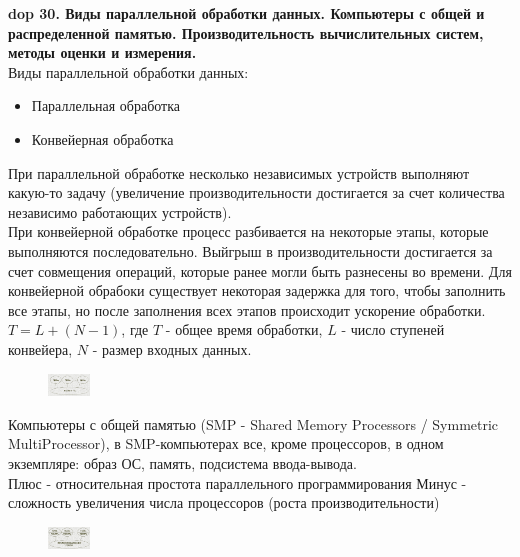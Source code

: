 \textbf{\LARGE dop 30. Виды параллельной обработки данных. Компьютеры с общей и распределенной памятью. Производительность вычислительных систем, методы оценки и измерения.}\\

Виды параллельной обработки данных:
\begin{itemize}
    \item Параллельная обработка
    \item Конвейерная обработка
\end{itemize}

При параллельной обработке несколько независимых устройств выполняют какую-то задачу (увеличение производительности достигается за счет количества независимо работающих устройств).\\
При конвейерной обработке процесс разбивается на некоторые этапы, которые выполняются последовательно. Выйгрыш в производительности достигается за счет совмещения операций, которые ранее могли быть разнесены во времени. Для конвейерной обрабоки существует некоторая задержка для того, чтобы заполнить все этапы, но после заполнения всех этапов происходит ускорение обработки. $T = L + (N - 1)$, где $T$ - общее время обработки, $L$ - число ступеней конвейера, $N$ - размер входных данных.\\

\begin{figure}
    \centering
    \includegraphics[width=0.1\textwidth]{pics/smp-computer.png}
\end{figure}

Компьютеры с общей памятью (SMP - Shared Memory Processors / Symmetric MultiProcessor), в SMP-компьютерах все, кроме процессоров, в одном экземпляре: образ ОС, память, подсистема ввода-вывода.\\
Плюс - относительная простота параллельного программирования
Минус - сложность увеличения числа процессоров (роста производительности)\\


\begin{figure}
    \centering
    \includegraphics[width=0.1\textwidth]{pics/distributed-memory-computer.png}
\end{figure}

